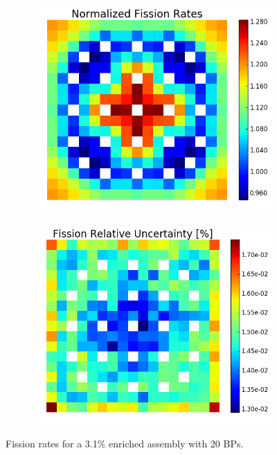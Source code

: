 \begin{figure}[h!]
\centering
\begin{subfigure}{0.44\textwidth}
  \centering
  \includegraphics[width=\linewidth]{figures/benchmarks/fission-rates/fiss-mean-assm-31-20BPs}
  \caption{}
  \label{fig:chap7-fiss-rate-mean-3.1-20BAs-assm}
\end{subfigure}%
\begin{subfigure}{0.44\textwidth}
  \centering
  \includegraphics[width=\linewidth]{figures/benchmarks/fission-rates/fiss-rel-err-assm-31-20BPs}
  \caption{}
  \label{fig:chap7-fiss-rate-rel-err-3.1-20BAs-assm}
\end{subfigure}%
\caption[Fission rates for a 3.1\% enriched assembly with 20 BPs]{Fission rates for a 3.1\% enriched assembly with 20 \ac{BP}s.}
\label{fig:chap7-fiss-rates-3.1-assm-20BAs}
\end{figure}

